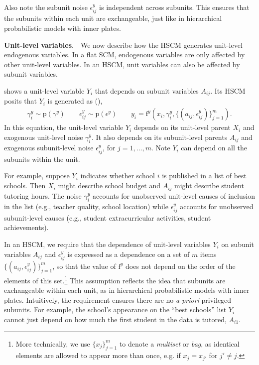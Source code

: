 \documentclass[12pt]{article}
\newcommand{\pr}{\mathrm{p}}
\newcommand{\f}{\mathrm{f}}
\newcommand{\parhead}[1]{\vspace{0.1in} \noindent \textbf{#1}. \,\,}
\begin{document}
Also note the subunit noise $\epsilon_{ij}^y$ is independent across subunits.
This ensures that the subunits within each unit are exchangeable, just like in hierarchical probabilistic models with inner plates.

\parhead{Unit-level variables}  We now describe how the HSCM generates unit-level endogenous variables.  In a flat SCM, endogenous variables are only affected by other unit-level variables.  In an HSCM, unit variables can also be affected by subunit variables.

 shows a unit-level variable $Y_i$ that depends on subunit variables $A_{ij}$. Its HSCM posits that $Y_i$ is generated as (),
\begin{align} \label{eqn:hscm_unit_gen} \gamma_i^y \sim \pr(\gamma^y)
  \quad \quad
    \epsilon_{ij}^y \sim \pr(\epsilon^y)
  \quad \quad
    y_{i} = \f^y(x_i, \gamma_i^y, \{(a_{ij}, \epsilon^y_{ij})\}_{j=1}^m).
\end{align}
In this equation, the unit-level variable $Y_i$ depends on its unit-level parent $X_i$ and exogenous unit-level noise $\gamma_i^y$.  It also depends on its subunit-level parents $A_{ij}$ and exogenous subunit-level noise $\epsilon_{ij}^y$, for $j=1, \ldots, m$.  Note $Y_i$ can depend on all the subunits within the unit.

For example, suppose $Y_i$ indicates whether school $i$ is published in a list of best schools. Then $X_i$ might describe school budget and $A_{ij}$ might describe student tutoring hours.  The noise $\gamma_i^y$ accounts for unobserved unit-level causes of inclusion in the list (e.g., teacher quality, school location) while $\epsilon^y_{ij}$ accounts for unobserved subunit-level causes (e.g., student extracurricular activities, student achievements).

In an HSCM, we require that the dependence of unit-level variables $Y_i$ on subunit variables $A_{ij}$ and $\epsilon^y_{ij}$ is expressed as a dependence on a set of $m$ items $\{(a_{ij}, \epsilon^y_{ij})\}_{j=1}^m$, so that the value of $\f^y$ does not depend on the order of the elements of this set.\footnote{More technically, we use $\{x_j\}_{j=1}^m$ to denote a \textit{multiset} or \textit{bag}, as identical elements are allowed to appear more than once, e.g. if $x_j = x_{j'}$ for $j' \neq j$.}
This assumption reflects the idea that subunits are exchangeable within each unit, as in hierarchical probabilistic models with inner plates.
Intuitively, the requirement ensures there are no \textit{a priori} privileged subunits.  For example, the school's appearance on the ``best schools'' list $Y_i$ cannot just depend on how much the first student in the data is tutored, $A_{i1}$.
\end{document}
